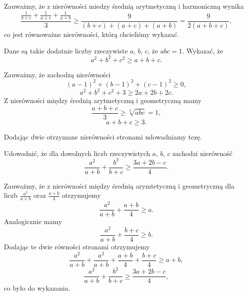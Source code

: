 \noindent
Zauważmy, że z nierówności miedzy średnią arytmetyczną i harmoniczną wynika
\[
	\frac{\frac{1}{b + c} + \frac{1}{a + c} + \frac{1}{a + b}}{3} \geqslant \frac{9}{(b + c) + (a + c) + (a + b)} = \frac{9}{2(a + b + c)},
\]
co jest równoważne nierówności, którą chcieliśmy wykazać.

\vspace{5px}

\begin{problem}{4} 
	Dane są takie dodatnie liczby rzeczywiste $a$, $b$, $c$, że $abc = 1$. Wykazać, że
	\[
		a^2 + b^2 + c^2 \geqslant a + b + c.
	\]
\end{problem}

\vspace{5px}

\noindent
Zauważmy, że zachodzą nierówności
\[
	(a - 1)^2 + (b - 1)^2 + (c - 1)^2 \geqslant 0,
\]
\[
	a^2 + b^2 + c^2 + 3 \geqslant 2a + 2b + 2c.
\]
Z nierówności między średnią arytmetyczną i geometryczną mamy
\[
	\frac{a + b + c}{3} \geqslant \sqrt[3]{abc} = 1,
\]
\[
	a + b + c \geqslant 3.
\]

\noindent
Dodając dwie otrzymane nierówności stronami udowadniamy tezę.

\vspace{5px}

\begin{problem}{5} 
	Udowodnić, że dla dowolnych liczb rzeczywistych $a$, $b$, $c$ zachodzi nierówność
	\[
		\frac{a^2}{a + b} + \frac{b^2}{b + c} \geqslant \frac{3a + 2b - c}{4}. 
	\]
\end{problem}

\vspace{5px}

\noindent
Zauważmy, że z nierówności między średnią arymtetyczną i geometryczną dla liczb $\frac{a^2}{a + b}$ oraz $\frac{a + b}{4}$ otrzymujemy
\[
	\frac{a^2}{a + b} + \frac{a + b}{4} \geqslant a.
\]
Analogicznie mamy
\[
	\frac{a^2}{a + b} + \frac{b + c}{4} \geqslant b.
\]
Dodając te dwie równości stronami otrzymujemy
\[
	\frac{a^2}{a + b} + \frac{a^2}{a + b} + \frac{a + b}{4} + \frac{b + c}{4} \geqslant a + b,
\]
\[
	\frac{a^2}{a + b} + \frac{b^2}{b + c} \geqslant \frac{3a + 2b - c}{4},
\]
co było do wykazania.
